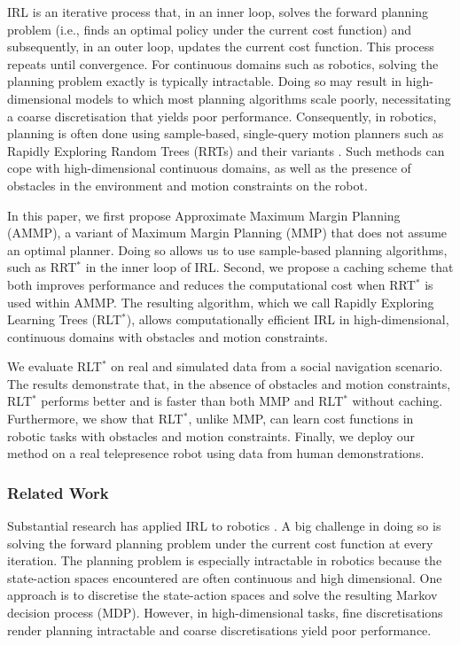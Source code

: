 \documentclass[a4paper,11pt]{report}
\begin{document}
IRL is an iterative process that, in an inner loop, solves the forward planning problem (i.e., finds an optimal policy under the current cost function) and subsequently, in an outer loop, updates the current cost function. This process repeats until convergence. For continuous domains such as robotics, solving the planning problem exactly is typically intractable. Doing so may result in high-dimensional models to which most planning algorithms scale poorly, necessitating a coarse discretisation that yields poor performance.  Consequently, in robotics, planning is often done using sample-based, single-query motion planners such as Rapidly Exploring Random Trees (RRTs) \cite{lavalle1998rapidly} and their variants \cite{karaman2011sampling}. Such methods can cope with high-dimensional continuous domains, as well as the presence of obstacles in the environment and motion constraints on the robot.


In this paper, we first propose Approximate Maximum Margin Planning (AMMP), a variant of Maximum Margin Planning (MMP) \cite{ratliff2006maximum} that does not assume an optimal planner. Doing so allows us to use sample-based planning algorithms, such as RRT$^*$ in the inner loop of IRL. Second, we propose a caching scheme that both improves performance and reduces the computational cost when RRT$^*$ is used within AMMP. The resulting algorithm, which we call Rapidly Exploring Learning Trees (RLT$^*$),  allows computationally efficient IRL in high-dimensional, continuous domains with obstacles and motion constraints. 

We evaluate RLT$^*$ on real and simulated data from a social navigation scenario. The results demonstrate that, in the absence of obstacles and motion constraints, RLT$^*$ performs better and is faster than both MMP and RLT$^*$ without caching. Furthermore, we show that RLT$^*$, unlike MMP, can learn cost functions in robotic tasks with obstacles and motion constraints. Finally, we deploy our method on a real telepresence robot using data from human demonstrations.

\subsubsection{Related Work \label{sec:related_work}}


Substantial research has applied IRL to robotics \cite{henry2010learning,abbeel2008apprenticeship,vasquez2014inverse}.
A big challenge in doing so is solving the forward planning problem under the current cost function at every iteration. The planning problem is especially intractable in robotics because the state-action spaces encountered are often continuous and high dimensional. 
One approach is to discretise the state-action spaces and solve the resulting Markov decision process (MDP). However, in high-dimensional tasks, fine discretisations render planning intractable and coarse discretisations yield poor performance.
\end{document}
